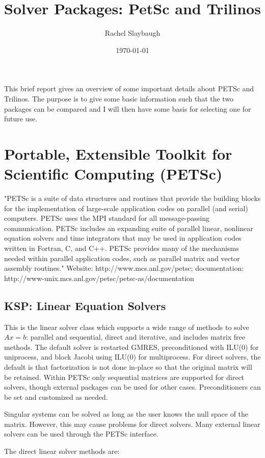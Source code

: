 \documentclass[12pt,twoside]{article}
\date{\today}
\title{Solver Packages: PetSc and Trilinos}
\author{Rachel Slaybaugh}
\begin{document}
\maketitle

This brief report gives an overview of some important details about PETSc and Trilinos. The purpose is to give some basic information such that the two packages can be compared and I will then have some basis for selecting one for future use. 

\section{Portable, Extensible Toolkit for Scientific Computing (PETSc)} 
"PETSc is a suite of data structures and routines that provide the building blocks for the implementation of large-scale application codes on parallel (and serial) computers. PETSc uses the MPI standard for all message-passing communication. PETSc includes an expanding suite of parallel linear, nonlinear equation solvers and time integrators that may be used in application codes written in Fortran, C, and C++. PETSc provides many of the mechanisms needed within parallel application codes, such as parallel matrix and vector assembly routines." Website: http://www.mcs.anl.gov/petsc; documentation: http://www-unix.mcs.anl.gov/petsc/petsc-as/documentation

\subsection{KSP: Linear Equation Solvers} 
This is the linear solver class which supports a wide range of methods to solve $Ax=b$: parallel and sequential, direct and iterative, and includes matrix free methods. The default solver is restarted GMRES, preconditioned with ILU(0) for uniprocess, and block Jacobi using ILU(0) for multiprocess. For direct solvers, the default is that factorization is not done in-place so that the original matrix will be retained. Within PETSc only sequential matrices are supported for direct solvers, though external packages can be used for other cases. Preconditioners can be set and customized as needed.

Singular systems can be solved as long as the user knows the null space of the matrix. However, this may cause problems for direct solvers. Many external linear solvers can be used through the PETSc interface.
\\
\begin{flushleft}
The direct linear solver methods are:
\end{flushleft}
\end{document}
